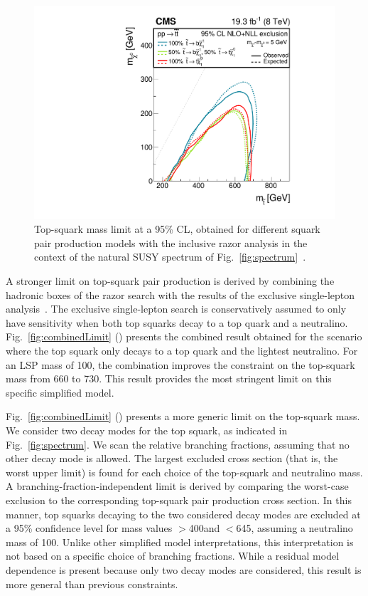 \begin{figure}[tb!]
\centering
 \includegraphics[width=\cmsFigWidth]{figs/analysis8TeV/T2HybridNew0Lp1Lp2LBARE.pdf}
 \caption{Top-squark mass limit at a 95\% CL, obtained for different
   squark pair production models with the inclusive razor analysis in the
   context of the natural SUSY spectrum of
   Fig.~\ref{fig:spectrum}~\cite{razor8TeV,jmgd}.\label{fig:stopSUMMARY}}

\end{figure}

A stronger limit on top-squark pair production is derived by combining
the hadronic boxes of the razor search with the results of the
exclusive single-lepton analysis~\cite{1LepMVA}. The exclusive
single-lepton search is conservatively assumed to only have
sensitivity when both top squarks decay to a top quark and a
neutralino. Fig.~\ref{fig:combinedLimit} (\cmsLeft) presents the combined result obtained for the scenario where the top
squark only decays to a top quark and the lightest neutralino. For an
LSP mass of 100\GeV, the combination improves the constraint on the
top-squark mass from 660 to 730\GeV. This result provides the
most stringent limit on this specific simplified model.


Fig.~\ref{fig:combinedLimit} (\cmsRight) presents a more generic limit on the
top-squark mass. We consider two decay modes for the top squark, as
indicated in Fig.~\ref{fig:spectrum}. We scan the relative branching
fractions, assuming that no other decay mode is allowed. The largest
excluded cross section (that is, the worst upper limit) is found for
each choice of the top-squark and neutralino mass. A
branching-fraction-independent limit is derived by comparing the
worst-case exclusion to the corresponding top-squark pair production
cross section. In this manner, top squarks decaying to the two
considered decay modes are excluded at a 95\% confidence level for
mass values $>$400\GeV and $<$645\GeV, assuming a neutralino mass of
100\GeV. Unlike other simplified model interpretations, this
interpretation is not based on a specific choice of branching
fractions. While a residual model dependence is present because only
two decay modes are considered, this result is more general than
previous constraints.

